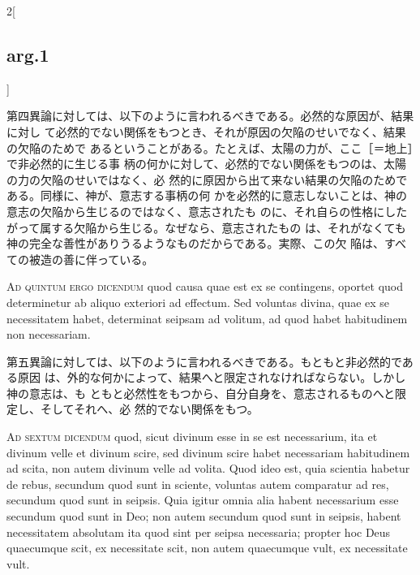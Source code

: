 \documentclass[paper=a4paper,fontsize=10pt,jafontsize=9pt,titlepage]{jlreq}
\begin{document}
\begin{paracol}{2}[\subsection{arg.1}]
\switchcolumn

第四異論に対しては、以下のように言われるべきである。必然的な原因が、結果に対し
 て必然的でない関係をもつとき、それが原因の欠陥のせいでなく、結果の欠陥のためで
 あるということがある。たとえば、太陽の力が、ここ［＝地上］で非必然的に生じる事
 柄の何かに対して、必然的でない関係をもつのは、太陽の力の欠陥のせいではなく、必
 然的に原因から出て来ない結果の欠陥のためである。同様に、神が、意志する事柄の何
 かを必然的に意志しないことは、神の意志の欠陥から生じるのではなく、意志されたも
 のに、それ自らの性格にしたがって属する欠陥から生じる。なぜなら、意志されたもの
 は、それがなくても神の完全な善性がありうるようなものだからである。実際、この欠
 陥は、すべての被造の善に伴っている。

\switchcolumn*[\subsection{ad.5}]


{\scshape Ad quintum ergo dicendum} quod causa quae est ex se contingens,
oportet quod determinetur ab aliquo exteriori ad effectum. Sed voluntas divina,
quae ex se necessitatem habet, determinat seipsam ad volitum, ad quod habet
habitudinem non necessariam.

\switchcolumn

第五異論に対しては、以下のように言われるべきである。もともと非必然的である原因
 は、外的な何かによって、結果へと限定されなければならない。しかし神の意志は、も
 ともと必然性をもつから、自分自身を、意志されるものへと限定し、そしてそれへ、必
 然的でない関係をもつ。

\switchcolumn*[\subsection{ad.6}]


{\scshape Ad sextum dicendum} quod, sicut divinum esse in se est necessarium,
ita et divinum velle et divinum scire, sed divinum scire habet necessariam
habitudinem ad scita, non autem divinum velle ad volita. Quod ideo est, quia
scientia habetur de rebus, secundum quod sunt in sciente, voluntas autem
comparatur ad res, secundum quod sunt in seipsis. Quia igitur omnia alia habent
necessarium esse secundum quod sunt in Deo; non autem secundum quod sunt in
seipsis, habent necessitatem absolutam ita quod sint per seipsa necessaria;
propter hoc Deus quaecumque scit, ex necessitate scit, non autem quaecumque
vult, ex necessitate vult.

\switchcolumn


\end{paracol}
\end{document}

